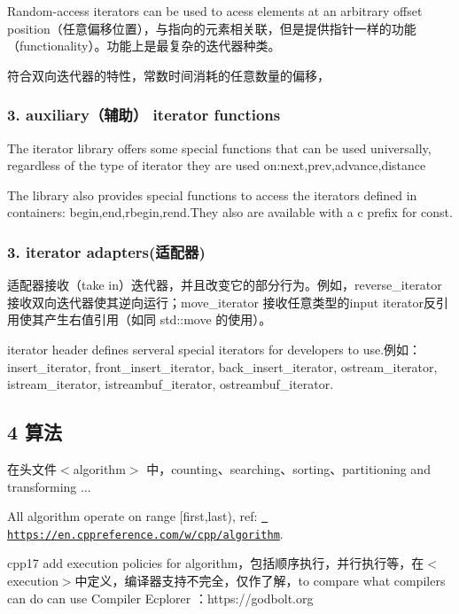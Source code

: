 Random-\/access iterators can be used to acess elements at an arbitrary offset position（任意偏移位置），与指向的元素相关联，但是提供指针一样的功能（functionality）。功能上是最复杂的迭代器种类。

符合双向迭代器的特性，常数时间消耗的任意数量的偏移，

\subsubsection*{3. auxiliary（辅助） iterator functions}

The iterator library offers some special functions that can be used universally, regardless of the type of iterator they are used on\+:next,prev,advance,distance

The library also provides special functions to access the iterators defined in containers\+: begin,end,rbegin,rend.\+They also are available with a c prefix for const.

\subsubsection*{3. iterator adapters(适配器)}

适配器接收（take in）迭代器，并且改变它的部分行为。例如，reverse\+\_\+iterator 接收双向迭代器使其逆向运行；move\+\_\+iterator 接收任意类型的input iterator反引用使其产生右值引用（如同 std\+::move 的使用）。

iterator header defines serveral special iterators for developers to use.\+例如：insert\+\_\+iterator, front\+\_\+insert\+\_\+iterator, back\+\_\+insert\+\_\+iterator, ostream\+\_\+iterator, istream\+\_\+iterator, istreambuf\+\_\+iterator, ostreambuf\+\_\+iterator.

\subsection*{4 算法}

在头文件$<$algorithm$>$ 中，counting、searching、sorting、partitioning and transforming ...

All algorithm operate on range \mbox{[}first,last), ref\+: \href{https://en.cppreference.com/w/cpp/algorithm}{\texttt{ https\+://en.\+cppreference.\+com/w/cpp/algorithm}}.

cpp17 add execution policies for algorithm，包括顺序执行，并行执行等，在$<$execution$>$中定义，编译器支持不完全，仅作了解，to compare what compilers can do can use Compiler Ecplorer ：https\+://godbolt.org


